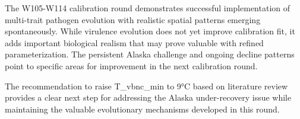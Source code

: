 \documentclass[11pt,a4paper]{article}
\begin{document}
The W105-W114 calibration round demonstrates successful implementation of multi-trait pathogen evolution with realistic spatial patterns emerging spontaneously. While virulence evolution does not yet improve calibration fit, it adds important biological realism that may prove valuable with refined parameterization. The persistent Alaska challenge and ongoing decline patterns point to specific areas for improvement in the next calibration round.

The recommendation to raise T\_vbnc\_min to 9°C based on literature review provides a clear next step for addressing the Alaska under-recovery issue while maintaining the valuable evolutionary mechanisms developed in this round.
\end{document}
